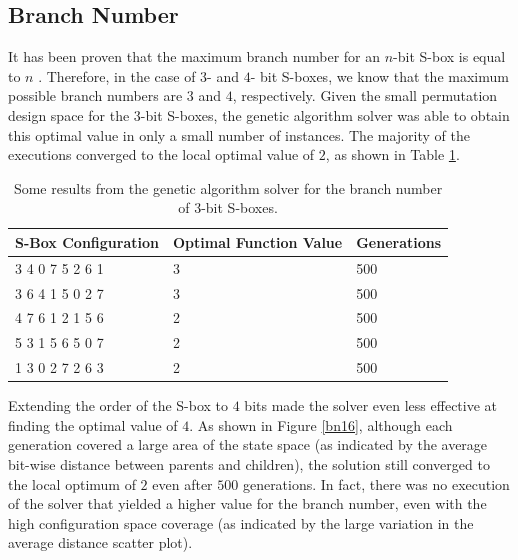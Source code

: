 \documentclass[11pt]{article}
\begin{document}
\subsection{Branch Number}


It has been proven that the maximum branch number for an $n$-bit S-box is equal to $n$ \cite{MaxBN}. Therefore, in the case of $3$- and $4$- bit S-boxes, we know that the maximum possible branch numbers are $3$ and $4$, respectively. Given the small permutation design space for the $3$-bit S-boxes, the genetic algorithm solver was able to obtain this optimal value in only a small number of instances. The majority of the executions converged to the local optimal value of $2$, as shown in Table \ref{bnTable}.

\begin{table}
	\centering
	\label{bnTable}
	\caption{Some results from the genetic algorithm solver for the branch number of $3$-bit S-boxes.}
    \begin{tabular}{|l|l|l|}
        \hline
        S-Box Configuration & Optimal Function Value & Generations \\ \hline
        3     4     0     7     5     2     6     1 & 3 & 500 \\ 
	3     6     4     1     5     0     2     7 & 3 & 500 \\ 
        4     7     6     1     2     1     5     6 & 2 & 500 \\ 
        5     3     1     5     6     5     0     7 & 2 & 500 \\ 
        1     3     0     2     7     2     6     3 & 2 & 500 \\ 
        \hline
    \end{tabular}
\end{table}

Extending the order of the S-box to $4$ bits made the solver even less effective at finding the optimal value of $4$. As shown in Figure \ref{bn16}, although each generation covered a large area of the state space (as indicated by the average bit-wise distance between parents and children), the solution still converged to the local optimum of $2$ even after $500$ generations. In fact, there was no execution of the solver that yielded a higher value for the branch number, even with the high configuration space coverage (as indicated by the large variation in the average distance scatter plot).
\end{document}
